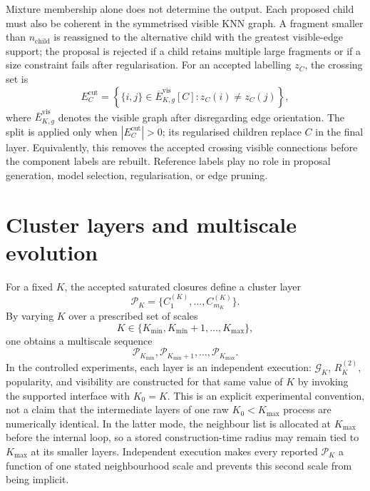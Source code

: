 \documentclass[pdflatex,sn-mathphys-num]{sn-jnl}
\newcommand{\calG}{\mathcal{G}}
\newcommand{\calP}{\mathcal{P}}
\begin{document}
Mixture membership alone does not determine the output.  Each proposed child
must also be coherent in the symmetrised visible KNN graph.  A fragment smaller
than $n_{\mathrm{child}}$ is reassigned to the alternative child with the
greatest visible-edge support; the proposal is rejected if a child retains
multiple large fragments or if a size constraint fails after regularisation.
For an accepted labelling $z_C$, the crossing set is
\begin{equation}
E_C^{\mathrm{cut}}=
\left\{\{i,j\}\in\overline E_{K,g}^{\mathrm{vis}}[C]:
z_C(i)\neq z_C(j)\right\},
\label{eq:pruning_cut}
\end{equation}
where $\overline E_{K,g}^{\mathrm{vis}}$ denotes the visible graph after
disregarding edge orientation.  The split is applied only when
$|E_C^{\mathrm{cut}}|>0$; its regularised children replace $C$ in the final
layer.  Equivalently, this removes the accepted crossing visible connections
before the component labels are rebuilt.  Reference labels play no role in
proposal generation, model selection, regularisation, or edge pruning.

\section{Cluster layers and multiscale evolution}\label{sec:layers}

For a fixed $K$, the accepted saturated closures define a cluster layer
\begin{equation}
\calP_K=\{C_1^{(K)},\ldots,C_{m_K}^{(K)}\}.
\end{equation}
By varying $K$ over a prescribed set of scales
\begin{equation}
K\in\{K_{\min},K_{\min}+1,\ldots,K_{\max}\},
\end{equation}
one obtains a multiscale sequence
\begin{equation}
\calP_{K_{\min}},\calP_{K_{\min}+1},\ldots,\calP_{K_{\max}}.
\end{equation}
In the controlled experiments, each layer is an independent execution:
$\calG_K$, $R_K^{(2)}$, popularity, and visibility are constructed for that
same value of $K$ by invoking the supported interface with $K_0=K$.  This is an
explicit experimental convention, not a claim that the intermediate layers of
one raw $K_0\!<\!K_{\max}$ process are numerically identical.  In the latter
mode, the neighbour list is allocated at $K_{\max}$ before the internal loop,
so a stored construction-time radius may remain tied to $K_{\max}$ at its
smaller layers.  Independent execution makes every reported $\calP_K$ a
function of one stated neighbourhood scale and prevents this second scale from
being implicit.
\end{document}
